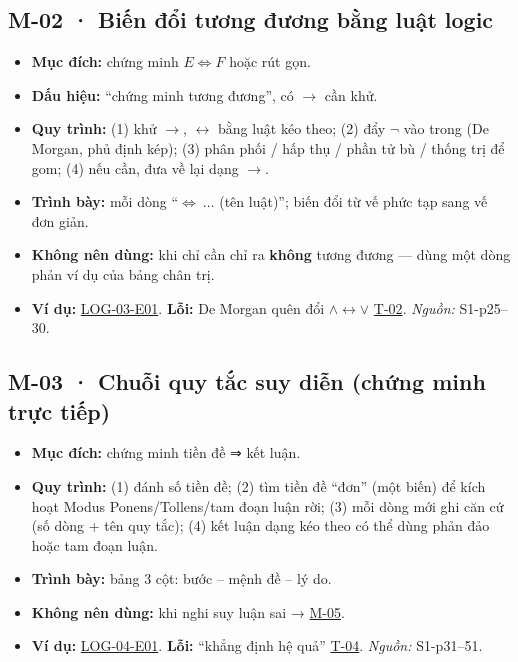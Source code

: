 \documentclass[
  10pt,
  twoside,openany]{book}
\providecommand{\tightlist}{%
  \setlength{\itemsep}{0pt}\setlength{\parskip}{0pt}}
\begin{document}
\hypertarget{M-02}{%
\subsection{M-02 · Biến đổi tương đương bằng luật logic}\label{M-02}}

\begin{itemize}
\tightlist
\item
  \textbf{Mục đích:} chứng minh \(E\Leftrightarrow F\) hoặc rút gọn.
\item
  \textbf{Dấu hiệu:} ``chứng minh tương đương'', có \(\to\) cần khử.
\item
  \textbf{Quy trình:} (1) khử \(\to\), \(\leftrightarrow\) bằng luật kéo
  theo; (2) đẩy \(\neg\) vào trong (De Morgan, phủ định kép); (3) phân
  phối / hấp thụ / phần tử bù / thống trị để gom; (4) nếu cần, đưa về
  lại dạng \(\to\).
\item
  \textbf{Trình bày:} mỗi dòng ``\(\Leftrightarrow\ \dots\) (tên
  luật)''; biến đổi từ vế phức tạp sang vế đơn giản.
\item
  \textbf{Không nên dùng:} khi chỉ cần chỉ ra \textbf{không} tương đương
  --- dùng một dòng phản ví dụ của bảng chân trị.
\item
  \textbf{Ví dụ:} \protect\hyperlink{LOG-03-E01}{LOG-03-E01}.
  \textbf{Lỗi:} De Morgan quên đổi \(\wedge\leftrightarrow\vee\)
  \protect\hyperlink{T-02}{T-02}. \emph{Nguồn:} S1-p25--30.
\end{itemize}

\hypertarget{M-03}{%
\subsection{M-03 · Chuỗi quy tắc suy diễn (chứng minh trực
tiếp)}\label{M-03}}

\begin{itemize}
\tightlist
\item
  \textbf{Mục đích:} chứng minh tiền đề ⇒ kết luận.
\item
  \textbf{Quy trình:} (1) đánh số tiền đề; (2) tìm tiền đề ``đơn'' (một
  biến) để kích hoạt Modus Ponens/Tollens/tam đoạn luận rời; (3) mỗi
  dòng mới ghi căn cứ (số dòng + tên quy tắc); (4) kết luận dạng kéo
  theo có thể dùng phản đảo hoặc tam đoạn luận.
\item
  \textbf{Trình bày:} bảng 3 cột: bước -- mệnh đề -- lý do.
\item
  \textbf{Không nên dùng:} khi nghi suy luận sai →
  \protect\hyperlink{M-05}{M-05}.
\item
  \textbf{Ví dụ:} \protect\hyperlink{LOG-04-E01}{LOG-04-E01}.
  \textbf{Lỗi:} ``khẳng định hệ quả'' \protect\hyperlink{T-04}{T-04}.
  \emph{Nguồn:} S1-p31--51.
\end{itemize}
\end{document}
